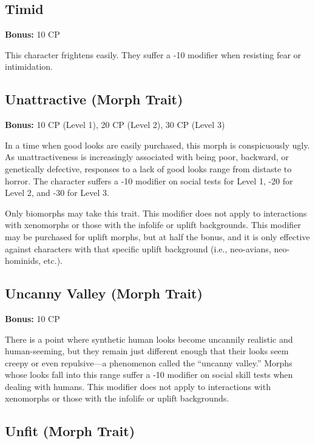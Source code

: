 \subsection{Timid}
\label{sec:traits-timid}

\textbf{Bonus:} 10 CP

This character frightens easily. They suffer a -10 modifier when resisting fear or intimidation.

\subsection{Unattractive (Morph Trait)}
\label{sec:traits-unattractive}

\textbf{Bonus:} 10 CP (Level 1), 20 CP (Level 2), 30 CP (Level 3)

In a time when good looks are easily purchased, this morph is conspicuously ugly. As unattractiveness is increasingly associated with being poor, backward, or genetically defective, responses to a lack of good looks range from distaste to horror. The character suffers a -10 modifier on social tests for Level 1, -20 for Level 2, and -30 for Level 3.

Only biomorphs may take this trait. This modifier does not apply to interactions with xenomorphs or those with the infolife or uplift backgrounds. This modifier may be purchased for uplift morphs, but at half the bonus, and it is only effective against characters with that specific uplift background (i.e., neo-avians, neo-hominids, etc.).

\subsection{Uncanny Valley (Morph Trait)}
\label{sec:traits-uncanny-valley}

\textbf{Bonus:} 10 CP

There is a point where synthetic human looks become uncannily realistic and human-seeming, but they remain just different enough that their looks seem creepy or even repulsive—a phenomenon called the “uncanny valley.” Morphs whose looks fall into this range suffer a -10 modifier on social skill tests when dealing with humans. This modifier does not apply to interactions with xenomorphs or those with the infolife or uplift backgrounds.

\subsection{Unfit (Morph Trait)}
\label{sec:traits-unfit}

